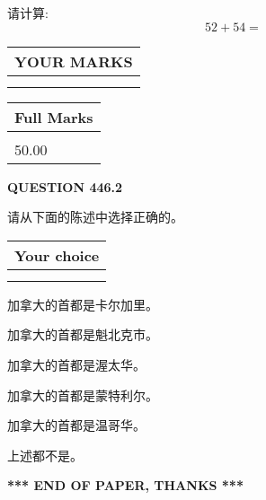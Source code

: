 \documentclass{ctexart}
\begin{document}
  
 
请计算:
\begin{equation}
52 +  %
54 = \nonumber
\end{equation}
 

 

 
  
\vspace{0.2in}
  
\noindent\begin{tabular}{|l|}
\hline
 YOUR MARKS  \\
\hline
 \\ 
 \\ 
\hline
\end{tabular}
\hspace{0.05in} \begin{tabular}{|l|}
\hline
 Full Marks  \\
\hline
 \\ 
50.00 \\
\hline
\end{tabular}
{\textbf{\Large{QUESTION
446.2 
}}}
  
  
请从下面的陈述中选择正确的。
  
  
\noindent\hspace{3.0in} \begin{tabular}{|l|}
\hline
Your choice \\
\hline
 \\ 
 \\ 
\hline
\end{tabular}
  
  
 
 
加拿大的首都是卡尔加里。
 
 
加拿大的首都是魁北克市。
 
 
加拿大的首都是渥太华。
 
 
加拿大的首都是蒙特利尔。
 
 
加拿大的首都是温哥华。
 
 
 上述都不是。
 
 
   
   
 \vspace{0.2in}
 
   
   
   
   
\vspace{1.0in} 
{\textbf{\large{ *** END OF PAPER, THANKS *** }}} 
   
\end{document}
